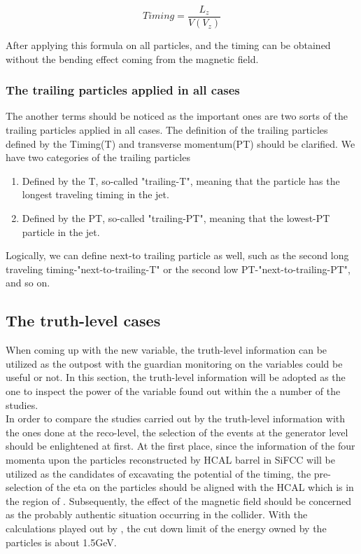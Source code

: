 \begin{equation}
 Timing = \frac{L_{z}}{V(V_{z})} 
\end{equation}

After applying this formula on all particles, and the timing can be obtained without the bending effect coming from the magnetic field.\\ 
\subsubsection{The trailing particles applied in all cases}
The another terms should be noticed as the important ones are two sorts of the trailing particles applied in all cases. The definition of the trailing particles defined by the Timing(T) and transverse momentum(PT) should be clarified. We have two categories of the trailing particles
\begin{enumerate}
\item Defined by the T, so-called "trailing-T", meaning that the particle has the longest traveling timing in the jet. 
\item Defined by the PT, so-called "trailing-PT", meaning that the lowest-PT particle in the jet. 
\end{enumerate}

Logically, we can define next-to trailing particle as well, such as the second long traveling timing-"next-to-trailing-T" or the second low PT-"next-to-trailing-PT", and so on.

\subsection{The truth-level cases}
When coming up with the new variable, the truth-level information can be utilized as the outpost with the guardian monitoring on the variables could be useful or not. In this section, the truth-level information will be adopted as the one to inspect the power of the variable found out within the a number of the studies.\\

In order to compare the studies carried out by the truth-level information with the ones done at the reco-level, the selection of the events at the generator level should be enlightened at first. At the first place, since the information of the four momenta upon the particles reconstructed by HCAL barrel in SiFCC will be utilized as the candidates of excavating the potential of the timing, the pre-selection of the eta on the particles should be aligned with the HCAL which is in the region of . Subsequently, the effect of the magnetic field should be concerned as the probably authentic situation occurring in the collider. With the calculations played out by , the cut down limit of the energy owned by the particles is about 1.5GeV.\\     

